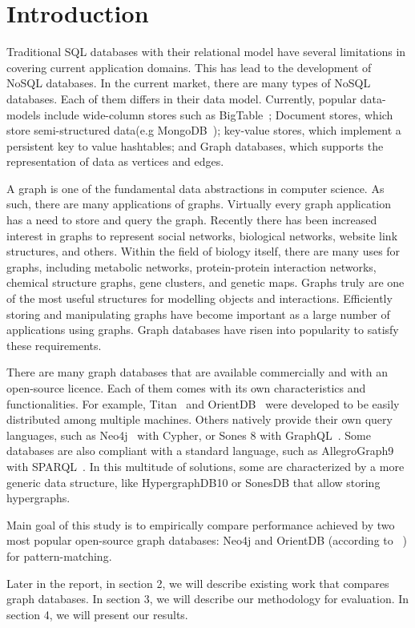 \section{Introduction}

Traditional SQL databases with their relational model have several limitations in covering current application domains. This has lead to the development of NoSQL databases. In the current market, there are many types of NoSQL databases. Each of them differs in their data model. Currently, popular data-models include wide-column stores such as BigTable~\cite{chang2008bigtable}; Document stores, which store semi-structured data(e.g MongoDB~\cite{chodorow2013mongodb}); key-value stores, which implement a persistent key to value hashtables; and Graph databases, which supports the representation of data as vertices and edges.

A graph is one of the fundamental data abstractions in computer science. As such, there are many applications of graphs. Virtually every graph application has a need to store and query the graph. Recently there has been increased interest in graphs to represent social networks, biological networks, website link structures, and others. Within the field of biology itself, there are many uses for graphs, including metabolic networks, protein-protein interaction networks, chemical structure graphs, gene clusters, and genetic maps. Graphs truly are one of the most useful structures for modelling objects and interactions. Efficiently storing and manipulating graphs have become important as a large number of applications using graphs. Graph databases have risen into popularity to satisfy these requirements.

There are many graph databases that are available commercially and with an open-source licence. Each of them comes with its own characteristics and functionalities. For example, Titan~\cite{jouili2013empirical} and OrientDB~\cite{tesoriero2013getting} were developed to be easily distributed among multiple machines. Others natively provide their own query languages, such as Neo4j~\cite{holzschuher2013performance} with Cypher, or Sones 8 with GraphQL~\cite{vazquez2017improving}. Some databases are also compliant with a standard language, such as AllegroGraph9~\cite{abburu2013format} with SPARQL~\cite{abburu2013format}. In this multitude of solutions, some are characterized by a more generic data structure, like HypergraphDB10 or SonesDB that allow storing hypergraphs. 

Main goal of this study is to empirically compare performance achieved by two most popular open-source graph databases: Neo4j and OrientDB (according to ~\cite{dbranking}) for pattern-matching.

Later in the report, in section 2, we will describe existing work that compares graph databases. In section 3, we will describe our methodology for evaluation. In section 4, we will present our results.   




